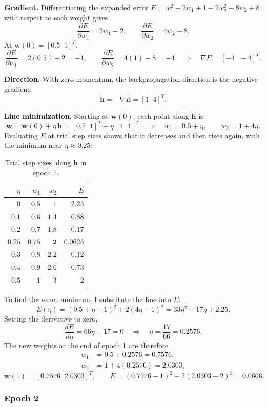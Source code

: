 \documentclass[11pt,letterpaper]{article}
\newcommand{\pd}[2]{\frac{\partial #1}{\partial #2}}
\begin{document}
\textbf{Gradient.} Differentiating the expanded error
$E=w_1^2-2w_1+1+2w_2^2-8w_2+8$ with respect to each weight gives
\[
\pd{E}{w_1}=2w_1-2,\qquad \pd{E}{w_2}=4w_2-8 .
\]
At $\mathbf w(0)=[0.5\;\;1]^{T}$,
\[
\pd{E}{w_1}=2(0.5)-2=-1,\qquad \pd{E}{w_2}=4(1)-8=-4
\quad\Longrightarrow\quad \nabla E=[-1\;\;-4]^{T}.
\]

\textbf{Direction.} With zero momentum, the backpropagation direction is
the negative gradient:
\[
\mathbf h=-\nabla E=[1\;\;4]^{T}.
\]

\textbf{Line minimization.} Starting at $\mathbf w(0)$, each point along
$\mathbf h$ is
\[
\mathbf w=\mathbf w(0)+\eta\,\mathbf h=[0.5\;\;1]^{T}+\eta\,[1\;\;4]^{T}
\quad\Longrightarrow\quad w_1=0.5+\eta,\qquad w_2=1+4\eta .
\]
Evaluating $E$ at trial step sizes shows that it decreases and then rises
again, with the minimum near $\eta\approx0.25$:

\begin{table}[H]
\centering
\caption{Trial step sizes along $\mathbf h$ in epoch 1.}
\renewcommand{\arraystretch}{1.2}
\begin{tabular}{rrrr}
\toprule
$\eta$ & $w_1$ & $w_2$ & $E$\\
\midrule
$0$    & $0.5$  & $1$   & $2.25$\\
$0.1$  & $0.6$  & $1.4$ & $0.88$\\
$0.2$  & $0.7$  & $1.8$ & $0.17$\\
$\mathbf{0.25}$ & $\mathbf{0.75}$ & $\mathbf{2}$ & $\mathbf{0.0625}$\\
$0.3$  & $0.8$  & $2.2$ & $0.12$\\
$0.4$  & $0.9$  & $2.6$ & $0.73$\\
$0.5$  & $1$    & $3$   & $2$\\
\bottomrule
\end{tabular}
\end{table}

To find the exact minimum, I substitute the line into $E$:
\[
E(\eta)=(0.5+\eta-1)^2+2(4\eta-1)^2=33\eta^2-17\eta+2.25 .
\]
Setting the derivative to zero,
\[
\frac{dE}{d\eta}=66\eta-17=0
\quad\Longrightarrow\quad \eta=\frac{17}{66}=0.2576 .
\]
The new weights at the end of epoch 1 are therefore
\begin{align*}
w_1&=0.5+0.2576=0.7576,\\
w_2&=1+4(0.2576)=2.0303,
\end{align*}
\[
\boxed{\mathbf w(1)=[0.7576\;\;2.0303]^{T}},\qquad
E=(0.7576-1)^2+2(2.0303-2)^2=0.0606 .
\]

\subsubsection*{Epoch 2}
\end{document}
